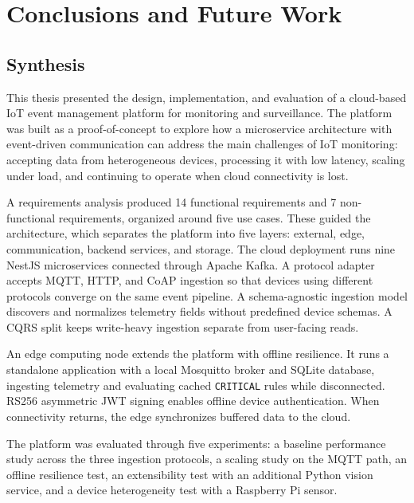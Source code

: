 

\chapter{Conclusions and Future Work}
\label{cha:Conclusions}

\section{Synthesis}

This thesis presented the design, implementation, and evaluation of a cloud-based \gls{IoT} event management platform for monitoring and surveillance. The platform was built as a proof-of-concept to explore how a microservice architecture with event-driven communication can address the main challenges of \gls{IoT} monitoring: accepting data from heterogeneous devices, processing it with low latency, scaling under load, and continuing to operate when cloud connectivity is lost.

A requirements analysis produced 14 functional requirements and 7 non-functional requirements, organized around five use cases. These guided the architecture, which separates the platform into five layers: external, edge, communication, backend services, and storage. The cloud deployment runs nine NestJS microservices connected through Apache Kafka. A protocol adapter accepts \gls{MQTT}, \gls{HTTP}, and \gls{CoAP} ingestion so that devices using different protocols converge on the same event pipeline. A schema-agnostic ingestion model discovers and normalizes telemetry fields without predefined device schemas. A \gls{CQRS} split keeps write-heavy ingestion separate from user-facing reads.

An edge computing node extends the platform with offline resilience. It runs a standalone application with a local Mosquitto broker and SQLite database, ingesting telemetry and evaluating cached \texttt{CRITICAL} rules while disconnected. RS256 asymmetric \gls{JWT} signing enables offline device authentication. When connectivity returns, the edge synchronizes buffered data to the cloud.

The platform was evaluated through five experiments: a baseline performance study across the three ingestion protocols, a scaling study on the \gls{MQTT} path, an offline resilience test, an extensibility test with an additional Python vision service, and a device heterogeneity test with a Raspberry Pi sensor.

